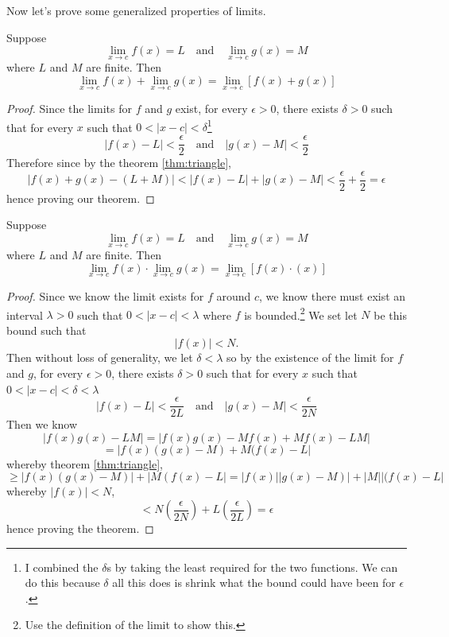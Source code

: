 \documentclass[11pt]{article}
\numberwithin{lemma}{section}
\numberwithin{equation}{section}
\numberwithin{define}{section}
\numberwithin{prop}{section}
\numberwithin{figure}{section}
\numberwithin{theorem}{section}
\numberwithin{cor}{section}
\newcounter{ex}[section]
\numberwithin{ex}{section}
\def\paren#1{\left(#1\right)}
\def\sbrak#1{\left[#1\right]}
\def\jand{\quad\text{and}\quad}
\begin{document}
Now let's prove some generalized properties of limits.

\begin{theorem}
Suppose
$$\lim_{x\to c}f(x)=L \jand \lim_{x\to c}g(x)=M$$
where $L$ and $M$ are finite. Then
$$\lim_{x\to c}f(x)+\lim_{x\to c}g(x)=\lim_{x\to c}\sbrak{f(x)+g(x)}$$
\end{theorem}
\begin{proof}
	Since the limits for $f$ and $g$ exist, for every $\epsilon>0$, there exists $\delta>0$ such that for every $x$ such that $0<|x-c|<\delta$\footnote{I combined the $\delta$s by taking the least required for the two functions. We can do this because $\delta$ all this does is shrink what the bound could have been for $\epsilon$.}
	$$|f(x)-L|<\frac{\epsilon}{2} \jand |g(x)-M|<\frac{\epsilon}{2}$$
	Therefore since by the theorem \eqref{thm:triangle},
	$$|f(x)+g(x)-(L+M)|<|f(x)-L|+|g(x)-M|<\frac{\epsilon}{2}+\frac{\epsilon}{2}=\epsilon$$
	hence proving our theorem.
\end{proof}

\begin{theorem}
Suppose
$$\lim_{x\to c}f(x)=L \jand \lim_{x\to c}g(x)=M$$
where $L$ and $M$ are finite. Then
$$\lim_{x\to c}f(x)\cdot\lim_{x\to c}g(x)=\lim_{x\to c}\sbrak{f(x)\cdot(x)}$$
\end{theorem}
\begin{proof}
	Since we know the limit exists for $f$ around $c$, we know there must exist an interval $\lambda>0$ such that $0<|x-c|<\lambda$ where $f$ is bounded.\footnote{
	Use the definition of the limit to show this.}
	We set let $N$ be this bound such that 
	$$|f(x)|<N.$$
	Then without loss of generality, we let $\delta<\lambda$ so by the existence of the limit for $f$ and $g$, for every $\epsilon>0$, there exists $\delta>0$ such that for every $x$ such that $0<|x-c|<\delta<\lambda$
	$$|f(x)-L|<\frac{\epsilon}{2L} \jand |g(x)-M|<\frac{\epsilon}{2N}$$
	Then we know
	$$|f(x)g(x)-LM|=|f(x)g(x)-Mf(x)+Mf(x)-LM|$$
	$$=|f(x)(g(x)-M)+M(f(x)-L|$$
	whereby theorem \eqref{thm:triangle},
	$$\ge |f(x)(g(x)-M)|+|M(f(x)-L|=|f(x)||g(x)-M)|+|M||(f(x)-L|$$
	whereby $|f(x)|<N$,
	$$<N\paren{\frac{\epsilon}{2N}}+L\paren{\frac{\epsilon}{2L}}=\epsilon$$
	hence proving the theorem.
\end{proof}
\end{document}
